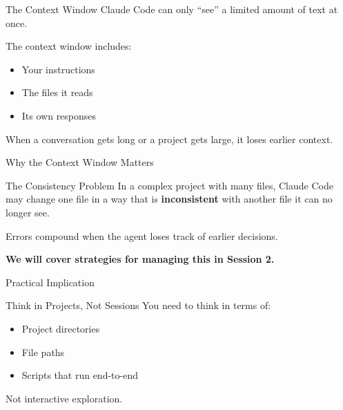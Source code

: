 \documentclass[aspectratio=169, 11pt]{beamer}
\begin{document}
\begin{frame}{The Context Window}
  Claude Code can only ``see'' a limited amount of text at once.

  \vspace{0.5em}
  The context window includes:
  \begin{itemize}
    \item Your instructions
    \item The files it reads
    \item Its own responses
  \end{itemize}

  \vspace{0.8em}
  \alert{When a conversation gets long or a project gets large, it loses earlier context.}
\end{frame}

\begin{frame}{Why the Context Window Matters}
  \begin{block}{The Consistency Problem}
    In a complex project with many files, Claude Code may change one file in a way that is \textbf{inconsistent} with another file it can no longer see.
  \end{block}

  \vspace{0.5em}
  Errors compound when the agent loses track of earlier decisions.

  \vspace{0.5em}
  \textbf{We will cover strategies for managing this in Session 2.}
\end{frame}

\begin{frame}{Practical Implication}
  \begin{alertblock}{Think in Projects, Not Sessions}
    You need to think in terms of:
    \begin{itemize}
      \item Project directories
      \item File paths
      \item Scripts that run end-to-end
    \end{itemize}
    Not interactive exploration.
  \end{alertblock}
\end{frame}

\end{document}
